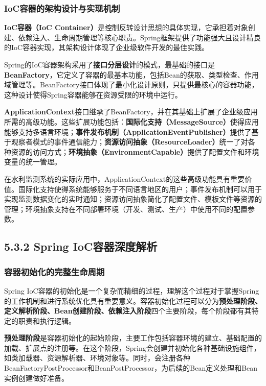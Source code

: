 \subsubsection{IoC容器的架构设计与实现机制}\label{iocux5bb9ux5668ux7684ux67b6ux6784ux8bbeux8ba1ux4e0eux5b9eux73b0ux673aux5236}

\textbf{IoC容器（IoC Container）}是控制反转设计思想的具体实现，它承担着对象创建、依赖注入、生命周期管理等核心职责。Spring框架提供了功能强大且设计精良的IoC容器实现，其架构设计体现了企业级软件开发的最佳实践。

Spring的IoC容器架构采用了\textbf{接口分层设计}的模式，最基础的接口是\textbf{BeanFactory}，它定义了容器的最基本功能，包括Bean的获取、类型检查、作用域管理等。BeanFactory接口体现了最小化设计原则，只提供最核心的容器功能，这种设计使得Spring容器能够在资源受限的环境中运行。

\textbf{ApplicationContext}接口继承了BeanFactory，并在其基础上扩展了企业级应用所需的高级功能。这些扩展功能包括：\textbf{国际化支持（MessageSource）}使得应用能够支持多语言环境；\textbf{事件发布机制（ApplicationEventPublisher）}提供了基于观察者模式的事件通信能力；\textbf{资源访问抽象（ResourceLoader）}统一了对各种资源的访问方式；\textbf{环境抽象（EnvironmentCapable）}提供了配置文件和环境变量的统一管理。

在水利监测系统的实际应用中，ApplicationContext的这些高级功能具有重要价值。国际化支持使得系统能够服务于不同语言地区的用户；事件发布机制可以用于实现监测数据变化的实时通知；资源访问抽象简化了配置文件、模板文件等资源的管理；环境抽象支持在不同部署环境（开发、测试、生产）中使用不同的配置参数。

\subsection{5.3.2 Spring IoC容器深度解析}\label{spring-iocux5bb9ux5668ux6df1ux5ea6ux89e3ux6790}

\subsubsection{容器初始化的完整生命周期}\label{ux5bb9ux5668ux521dux59cbux5316ux7684ux5b8cux6574ux751fux547dux5468ux671f}

Spring IoC容器的初始化是一个复杂而精细的过程，理解这个过程对于掌握Spring的工作机制和进行系统优化具有重要意义。容器初始化过程可以分为\textbf{预处理阶段、定义解析阶段、Bean创建阶段、依赖注入阶段}四个主要阶段，每个阶段都有其特定的职责和执行逻辑。

\textbf{预处理阶段}是容器初始化的起始阶段，主要工作包括容器环境的建立、基础配置的加载、扩展点的注册等。在这个阶段，Spring会创建并初始化各种基础设施组件，如类加载器、资源解析器、环境对象等。同时，会注册各种BeanFactoryPostProcessor和BeanPostProcessor，为后续的Bean定义处理和Bean实例创建做好准备。

